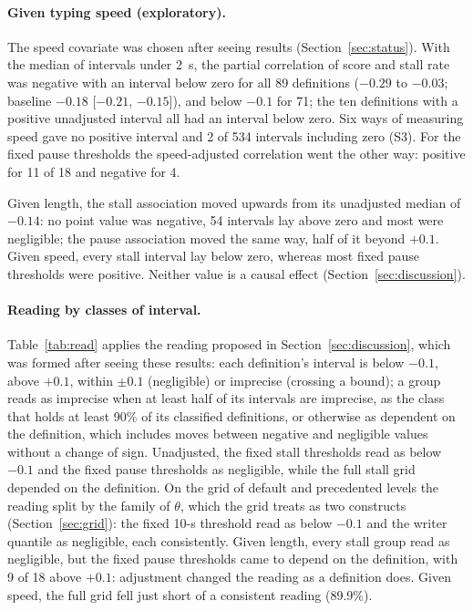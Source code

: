 \paragraph{Given typing speed (exploratory).} The speed covariate was chosen after seeing results
(Section~\ref{sec:status}). With the median of intervals under 2~s, the partial correlation of score and stall rate was
negative with an interval below zero for all 89 definitions ($-0.29$ to $-0.03$; baseline $-0.18$ [$-0.21$, $-0.15$]),
and below $-0.1$ for 71; the ten definitions with a positive unadjusted interval all had an interval below zero.
Six ways of measuring speed gave no positive interval and 2 of
534 intervals including zero (S3). For the fixed pause thresholds the speed-adjusted correlation went
the other way: positive for 11 of 18 and negative for 4.

Given length, the stall association moved upwards from its unadjusted median of $-0.14$: no point value was
negative, 54 intervals lay above zero and most were negligible; the pause association moved the same way, half of it
beyond $+0.1$. Given speed, every stall interval lay below zero, whereas most fixed pause thresholds were positive. Neither value is a causal effect (Section~\ref{sec:discussion}).

\paragraph{Reading by classes of interval.} Table~\ref{tab:read} applies the reading proposed in
Section~\ref{sec:discussion}, which was formed after seeing these results: each definition's interval is below $-0.1$,
above $+0.1$, within $\pm 0.1$ (negligible) or imprecise (crossing a bound); a group reads as imprecise when at least
half of its intervals are imprecise, as the class that holds at least 90\% of its classified definitions, or otherwise
as dependent on the definition, which includes moves between negative and negligible values without a change of sign.
Unadjusted, the fixed stall thresholds read as below $-0.1$ and the fixed pause thresholds as negligible, while the full
stall grid depended on the definition. On the grid of default and precedented levels the reading split by the family of
$\theta$, which the grid treats as two constructs (Section~\ref{sec:grid}): the fixed 10-s threshold read as below
$-0.1$ and the writer quantile as negligible, each consistently. Given length, every stall group read as negligible, but
the fixed pause thresholds came to depend on the definition, with 9 of 18 above $+0.1$: adjustment changed the reading
as a definition does. Given speed, the full grid fell just short of a consistent reading (89.9\%).

